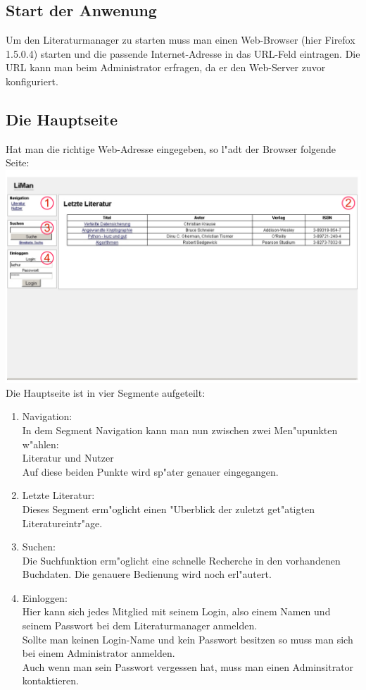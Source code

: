 \subsection{Start der Anwenung}
Um den Literaturmanager zu starten muss man einen Web-Browser (hier Firefox 1.5.0.4) starten und die passende Internet-Adresse in das URL-Feld eintragen. Die URL kann man beim Administrator erfragen, da er den Web-Server zuvor konfiguriert.
\subsection{Die Hauptseite}
Hat man die richtige Web-Adresse eingegeben, so l"adt der Browser folgende Seite:\\
\includegraphics[scale=0.8]{screen1.pdf}\\
Die Hauptseite ist in vier Segmente aufgeteilt:\\
\begin{enumerate}
\item Navigation:\\
In dem Segment Navigation kann man nun zwischen zwei Men"upunkten w"ahlen:\\
Literatur und Nutzer\\
Auf diese beiden Punkte wird sp"ater genauer eingegangen.
\item Letzte Literatur:\\
Dieses Segment erm"oglicht einen "Uberblick der zuletzt get"atigten Literatureintr"age.
\item Suchen:\\
Die Suchfunktion erm"oglicht eine schnelle Recherche in den vorhandenen Buchdaten. Die genauere Bedienung wird noch erl"autert.
\item Einloggen:\\
Hier kann sich jedes Mitglied mit seinem Login, also einem Namen und seinem Passwort bei dem Literaturmanager anmelden.\\
Sollte man keinen Login-Name und kein Passwort besitzen so muss man sich bei einem Administrator anmelden.\\
Auch wenn man sein Passwort vergessen hat, muss man einen Adminsitrator kontaktieren.\\
\end{enumerate}
